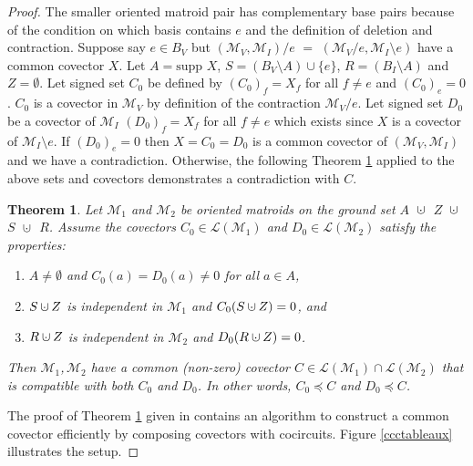 \documentclass{amsproc-sunycstr}
\theoremstyle{plain}
\newtheorem{theorem}{Theorem}
\theoremstyle{definition}
\theoremstyle{remark}
\newcommand{\supp}[1]{{{\mbox{supp\ }#1}}}
\newcommand{\dunion}
{\mbox{\hbox{\hskip4pt$\cdot$\hskip-4.62pt$\cup$\hskip2pt}}}
\newcommand{\OMP}[2]{#1,\,#2}
\begin{document}
\begin{proof}
The smaller oriented matroid pair has complementary
base pairs because of the condition on which basis contains $e$ and 
the definition of deletion and contraction.  Suppose say $e\in B_V$ but
$(\mathcal{M}_V,\mathcal{M}_I)/e$ $=$ 
$(\mathcal{M}_V/e,\mathcal{M}_I\setminus e)$ have a common covector
$X$.  Let $A=\supp{X}$, $S=(B_V\setminus A)\cup\{e\}$, $R=(B_I\setminus A)$
and $Z=\emptyset$.  Let signed set $C_0$ be defined by
$(C_0)_f=X_f$ for all $f\neq e$ and $(C_0)_e=0$.  
$C_0$ is a covector in $\mathcal{M}_V$ 
by definition of the contraction $\mathcal{M}_V/e$.
Let signed set $D_0$ be a covector of $\mathcal{M}_I$
$(D_0)_f=X_f$ for all $f\neq e$ which exists since $X$ is a covector
of $\mathcal{M}_I\setminus e$.  If $(D_0)_e=0$ then
$X=C_0=D_0$ is a common covector of 
$(\mathcal{M}_V,\mathcal{M}_I)$ and we have a 
contradiction.  Otherwise, the following Theorem \ref{CCCtheorem}
applied to the above 
sets and covectors demonstrates a contradiction with $C$.


\begin{theorem}
\label{CCCtheorem}
Let ${\mathcal M}_1$ and ${\mathcal M}_2$ be oriented matroids 
on 
%
%
the ground set $A$ $\dunion$
%
%
$Z$ $\dunion$ $S$ $\dunion$ $R$.
Assume the 
covectors 
$C_0\in {\mathcal L}({\mathcal M}_1)$ and
$D_0\in {\mathcal L}({\mathcal M}_2)$ satisfy the 
%
%
properties:
\begin{enumerate}
\item $A\neq\emptyset$ and $C_0(a)=D_0(a)\neq 0$ for all $a\in A$,
\item $S\dunion Z$ is independent in 
${\mathcal M}_1$ and $C_0(S\dunion Z)=0$, and
\item $R\dunion Z$ is independent in ${\mathcal M}_2$ and $D_0(R\dunion Z)=0$.
\end{enumerate}
Then 
\OMP{${\mathcal M}_1$}{${\mathcal M}_2$} have a common (non-zero) covector 
$C\in {\mathcal L}({\mathcal M}_1)\cap {\mathcal L}({\mathcal M}_2)$ that is
compatible with both $C_0$ and $D_0$.  In other words, $C_0\preceq C$ and 
$D_0\preceq C$.
\end{theorem}
The proof of Theorem \ref{CCCtheorem} given in \cite{sdcOMP}
contains an algorithm to construct
a common covector efficiently
by composing 
covectors with cocircuits.   
Figure \ref{ccctableaux} illustrates the setup.


\end{proof}
\end{document}
